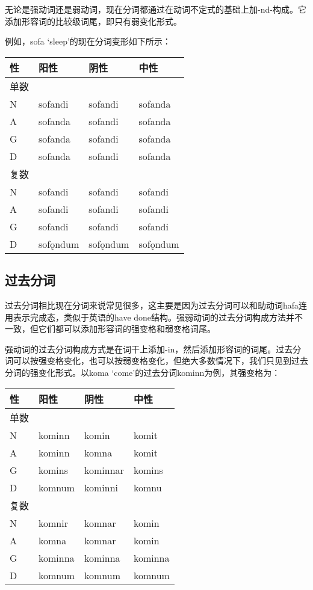 无论是强动词还是弱动词，现在分词都通过在动词不定式的基础上加-nd-构成。它添加形容词的比较级词尾，即只有弱变化形式。

例如，sofa `sleep‌'的现在分词变形如下所示：

\begin{longtable}{llll}
    \toprule
    性   & 阳性     & 阴性     & 中性     \\
    \midrule
    \endhead
    \bottomrule
    \endfoot
    单数 &          &          &          \\
    N    & sofandi  & sofandi  & sofanda  \\
    A    & sofanda  & sofandi  & sofanda  \\
    G    & sofanda  & sofandi  & sofanda  \\
    D    & sofanda  & sofandi  & sofanda  \\
    复数 &          &          &          \\
    N    & sofandi  & sofandi  & sofandi  \\
    A    & sofandi  & sofandi  & sofandi  \\
    G    & sofandi  & sofandi  & sofandi  \\
    D    & sofǫndum & sofǫndum & sofǫndum \\
\end{longtable}


\subsection{过去分词}\label{过去分词}

过去分词相比现在分词来说常见很多，这主要是因为过去分词可以和助动词hafa连用表示完成态，类似于英语的have
done结构。强弱动词的过去分词构成方法并不一致，但它们都可以添加形容词的强变格和弱变格词尾。

强动词的过去分词构成方式是在词干上添加-in，然后添加形容词的词尾。过去分词可以按强变格变化，也可以按弱变格变化，但绝大多数情况下，我们只见到过去分词的强变化形式。以koma `come‌'的过去分词kominn为例，其强变格为：

\begin{longtable}{llll}
    \toprule
    性   & 阳性    & 阴性     & 中性    \\
    \midrule
    \endhead
    \bottomrule
    \endfoot
    单数 &         &          &         \\
    N    & kominn  & komin    & komit   \\
    A    & kominn  & komna    & komit   \\
    G    & komins  & kominnar & komins  \\
    D    & komnum  & kominni  & komnu   \\
    复数 &         &          &         \\
    N    & komnir  & komnar   & komin   \\
    A    & komna   & komnar   & komin   \\
    G    & kominna & kominna  & kominna \\
    D    & komnum  & komnum   & komnum  \\
\end{longtable}

